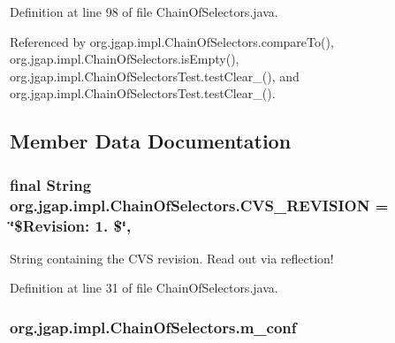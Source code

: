 Definition at line 98 of file Chain\-Of\-Selectors.\-java.



Referenced by org.\-jgap.\-impl.\-Chain\-Of\-Selectors.\-compare\-To(), org.\-jgap.\-impl.\-Chain\-Of\-Selectors.\-is\-Empty(), org.\-jgap.\-impl.\-Chain\-Of\-Selectors\-Test.\-test\-Clear\-\_(), and org.\-jgap.\-impl.\-Chain\-Of\-Selectors\-Test.\-test\-Clear\-\_().



\subsection{Member Data Documentation}
\hypertarget{classorg_1_1jgap_1_1impl_1_1_chain_of_selectors_a506aea491defe82826e504d504be910b}{
\subsubsection[{C\-V\-S\-\_\-\-R\-E\-V\-I\-S\-I\-O\-N}]{\setlength{\rightskip}{0pt plus 5cm}final String org.\-jgap.\-impl.\-Chain\-Of\-Selectors.\-C\-V\-S\-\_\-\-R\-E\-V\-I\-S\-I\-O\-N = \char`\"{}\$Revision\-: 1. \$\char`\"{}\hspace{0.3cm}{\ttfamily [static]}, {\ttfamily [private]}}}\label{classorg_1_1jgap_1_1impl_1_1_chain_of_selectors_a506aea491defe82826e504d504be910b}
String containing the C\-V\-S revision. Read out via reflection! 

Definition at line 31 of file Chain\-Of\-Selectors.\-java.

\hypertarget{classorg_1_1jgap_1_1impl_1_1_chain_of_selectors_ae4fad23cc6cc7f47f8445baadab152c8}{
\subsubsection[{m\-\_\-conf}]{ org.\-jgap.\-impl.\-Chain\-Of\-Selectors.\-m\-\_\-conf\hspace{0.3cm}{\ttfamily [private]}}}\label{classorg_1_1jgap_1_1impl_1_1_chain_of_selectors_ae4fad23cc6cc7f47f8445baadab152c8}


